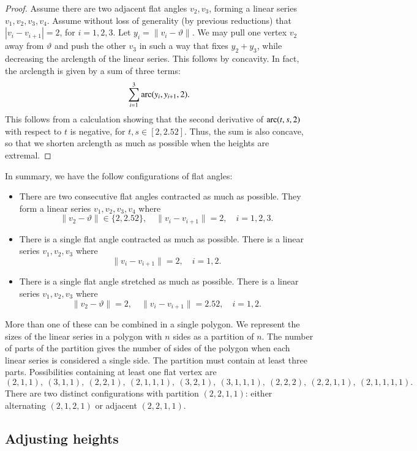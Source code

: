 \begin{proof}
Assume there are two adjacent flat angles $v_2,v_3$, forming a linear series $v_1,v_2,v_3,v_4$.
Assume without loss of generality (by previous reductions) that
$|v_i-v_{i+1}|=2$, for $i=1,2,3$.
Let $y_i = \|v_i-\vartheta\|$.
We may pull one vertex $v_2$ away from $\vartheta$ and push the other $v_3$ in such a way that fixes $y_2+y_3$, while decreasing the arclength of the linear series.  This follows by concavity.
In fact, the arclength is given by a sum of three terms:
  $$
  \sum_{i=1}^3\operatorname{arc}(y_i,y_{i+1},2).
  $$
This follows from a calculation showing that the second derivative of $\operatorname{arc}(t,s,2)$ with respect to $t$ is negative, for $t,s\in[2,2.52]$.  Thus, the
sum is also concave, so that we shorten arclength as much as possible when the heights are extremal.
\end{proof}

In summary, we have the follow configurations of flat angles:
\begin{itemize}
\item There are two consecutive flat angles contracted as much as possible.  They form a linear series $v_1,v_2,v_3,v_4$ where
$$
\|v_2-\vartheta\|\in\{2,2.52\},\quad
\|v_i-v_{i+1}\|=2,\quad i=1,2,3.
$$
\item There is a single flat angle contracted as much as possible.  There
is a linear series $v_1,v_2,v_3$ where
$$
\|v_i-v_{i+1}\|=2,\quad i=1,2.
$$
\item There is a single flat angle stretched as much as possible.  There
is a linear series $v_1,v_2,v_3$ where
$$
\|v_2-\vartheta\|=2,\quad
\|v_i-v_{i+1}\|=2.52,\quad i=1,2.
$$
\end{itemize}

More than one of these can be combined in a single polygon.  We represent the sizes of the linear series in a polygon with $n$ sides as a partition of $n$.
The number of parts of the partition gives the number of sides of the polygon when each linear series is considered a single side.  The partition must contain at least three parts.
Possibilities containing at least one flat vertex are
$$
(2,1,1),~(3,1,1),~(2,2,1),~(2,1,1,1),~(3,2,1),~(3,1,1,1),~(2,2,2),~(2,2,1,1),~(2,1,1,1,1).
$$
There are two distinct configurations with partition $(2,2,1,1)$: either
alternating $(2,1,2,1)$ or adjacent $(2,2,1,1)$.

\subsection{Adjusting heights}

